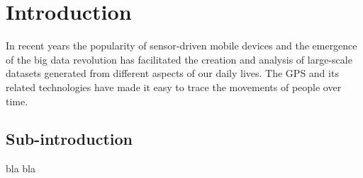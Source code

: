 \section{Introduction}
In recent years the popularity of sensor-driven mobile devices and the emergence of the big data revolution has facilitated the creation and analysis of large-scale datasets generated from different aspects of our daily lives\cite{lazer2009life}. The GPS and its related technologies have made it easy to trace the movements of people over time.

\subsection{Sub-introduction}
bla bla





